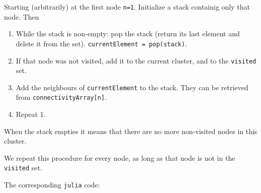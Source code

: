 Starting (arbitrarily) at the first node \texttt{n=1}. Initialize a stack containig only that node. Then
\begin{enumerate}
	\item While the stack is non-empty: pop the stack (return its last element and delete it from the set). \texttt{currentElement = pop(stack)}.
	\item  If that node was not visited, add it to the current cluster, and to the \texttt{visited} set.
	\item Add the neighbours of \texttt{currentElement} to the stack. They can be retrieved from \texttt{connectivityArray[n]}.
	\item Repeat 1.
\end{enumerate}
When the stack empties it means that there are no more non-visited nodes in this cluster.

We repeat this procedure for every node, as long as that node is not in the \texttt{visited} set.

The corresponding \texttt{julia} code:



